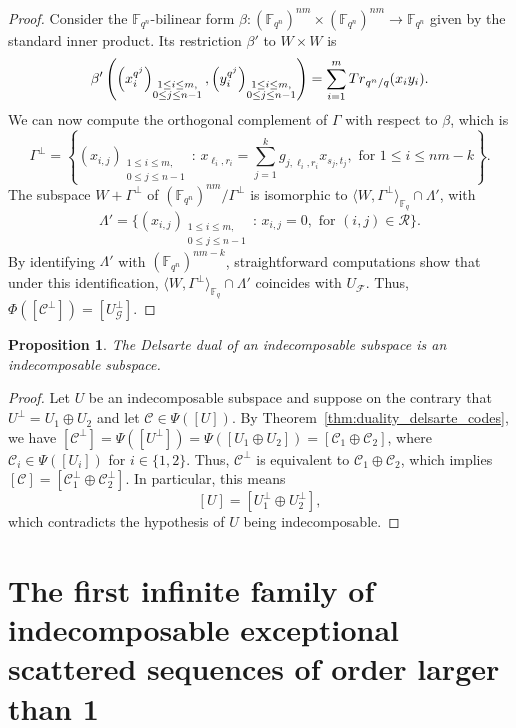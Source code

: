 \documentclass[11pt]{article}
\newtheorem{prop}[theo]{Proposition}
\theoremstyle{definition}
\numberwithin{equation}{section}
\begin{document}
\begin{proof}
    Consider the ${\mathbb F}_{q^n}$-bilinear form $\beta:(\mathbb{F}_{q^n})^{nm}\times (\mathbb{F}_{q^n})^{nm}\rightarrow {\mathbb F}_{q^n}$ given by the standard inner product. Its restriction $\beta'$ to $W\times W$ is 
    $$\beta'\left(\left(x_{i}^{q^j}\right)_{\substack{1\leq i \leq m,\\  0 \leq j \leq n-1}},\left(y_{i}^{q^j}\right)_{\substack{1\leq i \leq m,\\  0 \leq j \leq n-1}}\right)=\sum_{i=1}^m{\rm Tr}_{q^n/q}(x_iy_i).$$ 
    We can now compute the orthogonal complement of $\Gamma$ with respect to $\beta$, which is
    $$\Gamma^\perp=\left\{  (x_{i,j})_{\substack{1\leq i \leq m,\\  0 \leq j \leq n-1}}  \,:\, x_{\ell_i,r_i}=\sum_{j=1}^kg_{j,\ell_i,r_i}x_{s_j,t_j}, \mbox{ for }  1 \le i \le nm-k  \right\}.$$
    The subspace $W+\Gamma^\perp$ of $(\mathbb{F}_{q^n})^{nm}/\Gamma^\perp$ is isomorphic to $\langle W,\Gamma^\perp\rangle_{\mathbb{F}_q}\cap\Lambda'$, with 
    $$\Lambda'=\{(x_{i,j})_{\substack{1\leq i \leq m,\\  0 \leq j \leq n-1}}  \,:\,x_{i,j}=0, \mbox{ for } (i,j)\in\mathcal R\}.$$
    By identifying $\Lambda'$ with $(\mathbb{F}_{q^n})^{nm-k}$, straightforward computations show that under this identification, $\langle W,\Gamma^\perp\rangle_{\mathbb{F}_q}\cap\Lambda'$ coincides with $U_{\mathcal F}$. Thus, $\Phi([\mathcal{C}^\perp])=[U_{\mathcal G}^\perp]$.
\end{proof}


\begin{prop}
 The Delsarte dual of an indecomposable subspace is an indecomposable subspace.
\end{prop}

\begin{proof}
Let $U$ be an indecomposable subspace and suppose on the contrary that $U^\perp=U_1\oplus U_2$ and let $\mathcal{C} \in \Psi([U])$. By Theorem~\ref{thm:duality_delsarte_codes}, we have
$[\mathcal{C}^\perp]= \Psi([U^\perp])=\Psi([U_1\oplus U_2])=[\mathcal{C}_1\oplus \mathcal{C}_2]$, where $\mathcal{C}_i \in \Psi([U_i])$ for $i \in \{1,2\}$.
Thus, $\mathcal{C}^\perp$ is equivalent to $\mathcal{C}_1\oplus\mathcal{C}_2$, which implies 
$[\mathcal{C}]=[\mathcal{C}_1^\perp\oplus\mathcal{C}_2^\perp]$. In particular, this means
$$[U]=[U_1^\perp \oplus U_2^\perp],$$
which contradicts the hypothesis of $U$ being indecomposable.
\end{proof}

	
	
\section{The first infinite family of indecomposable exceptional scattered sequences of order larger than 1}\label{sec:construction}
\end{document}
